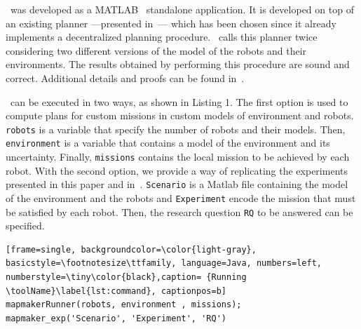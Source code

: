 
\toolName\  was developed as a  MATLAB~\cite{matlab} standalone application.
It is developed on top of an existing planner ---presented in~\cite{tumova2016multi}--- which has been chosen since it already implements a decentralized planning procedure.
\toolName\ calls this planner twice considering two different versions of the model of the robots and their environments. 
The results obtained by performing this procedure are sound and correct.
Additional details and proofs can be found in~\cite{mapmaker17}.


\toolName\ can be executed in two ways, as shown in Listing 1.
The first option is used to compute plans for custom missions in custom models of environment and robots.
\texttt{robots} is a variable that specify the number of robots and their models.
Then, \texttt{environment} is a variable that contains a model of the environment and its uncertainty.
Finally, \texttt{missions} contains the local mission to be achieved by each robot.
With the second option, we provide a way of replicating the experiments presented in this paper and in~\cite{mapmaker17}.
\texttt{Scenario} is a Matlab file containing the model of the environment and the robots and \texttt{Experiment} encode the mission that must be satisfied by each robot.
Then, the research question \texttt{RQ} to be answered can be specified.



\begin{lstlisting}[frame=single, backgroundcolor=\color{light-gray}, basicstyle=\footnotesize\ttfamily, language=Java, numbers=left, numberstyle=\tiny\color{black},caption= {Running \toolName}\label{lst:command}, captionpos=b]
mapmakerRunner(robots, environment , missions);
mapmaker_exp('Scenario', 'Experiment', 'RQ')
\end{lstlisting}







